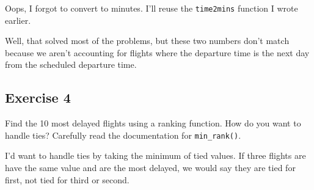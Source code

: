 \documentclass[]{book}
\newenvironment{Shaded}{\begin{snugshade}}{\end{snugshade}}
\newcommand{\CommentTok}[1]{\textcolor[rgb]{0.56,0.35,0.01}{\textit{#1}}}
\newcommand{\DataTypeTok}[1]{\textcolor[rgb]{0.13,0.29,0.53}{#1}}
\newcommand{\KeywordTok}[1]{\textcolor[rgb]{0.13,0.29,0.53}{\textbf{#1}}}
\newcommand{\NormalTok}[1]{#1}
\newcommand{\OperatorTok}[1]{\textcolor[rgb]{0.81,0.36,0.00}{\textbf{#1}}}
\newcommand{\StringTok}[1]{\textcolor[rgb]{0.31,0.60,0.02}{#1}}
\theoremstyle{definition}
\theoremstyle{definition}
\theoremstyle{definition}
\theoremstyle{remark}
\begin{document}
Oops, I forgot to convert to minutes. I'll reuse the \texttt{time2mins}
function I wrote earlier.

\begin{Shaded}
\end{Shaded}

Well, that solved most of the problems, but these two numbers don't
match because we aren't accounting for flights where the departure time
is the next day from the scheduled departure time.

\hypertarget{exercise-4-3}{%
\subsection{Exercise 4}\label{exercise-4-3}}

Find the 10 most delayed flights using a ranking function. How do you
want to handle ties? Carefully read the documentation for
\texttt{min\_rank()}.

I'd want to handle ties by taking the minimum of tied values. If three
flights are have the same value and are the most delayed, we would say
they are tied for first, not tied for third or second.
\end{document}

